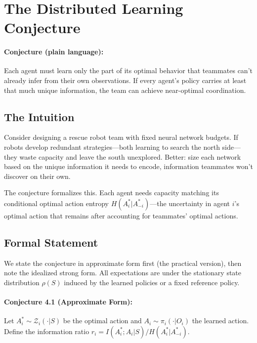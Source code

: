 \documentclass[10pt, letterpaper]{article}
\begin{document}
\section{The Distributed Learning Conjecture}
\label{sec:conjecture}

\paragraph{Conjecture (plain language):} Each agent must learn only the part of its optimal behavior that teammates can't already infer from their own observations. If every agent's policy carries at least that much unique information, the team can achieve near-optimal coordination.

\subsection{The Intuition}

Consider designing a rescue robot team with fixed neural network budgets. If robots develop redundant strategies---both learning to search the north side---they waste capacity and leave the south unexplored. Better: size each network based on the unique information it needs to encode, information teammates won't discover on their own.

The conjecture formalizes this. Each agent needs capacity matching its conditional optimal action entropy $H(A_i^*|A_{-i}^*)$---the uncertainty in agent $i$'s optimal action that remains after accounting for teammates' optimal actions.

\subsection{Formal Statement}

We state the conjecture in approximate form first (the practical version), then note the idealized strong form. All expectations are under the stationary state distribution $\rho(S)$ induced by the learned policies or a fixed reference policy.

\paragraph{Conjecture 4.1 (Approximate Form):} Let $A_i^* \sim \mathcal{Z}_i(\cdot|S)$ be the optimal action and $A_i \sim \pi_i(\cdot|O_i)$ the learned action. Define the information ratio $r_i = I(A_i^*; A_i | S) / H(A_i^* | A_{-i}^*)$.
\end{document}
